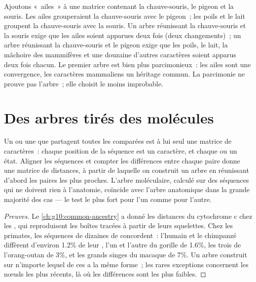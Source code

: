 \begin{example}\label{ex:g12:phylogenetic-trees:parsimony}
Ajoutons «~ailes~» à une matrice contenant la chauve-souris, le pigeon
et la souris. Les ailes grouperaient la chauve-souris avec le pigeon~;
les poils et le lait groupent la chauve-souris avec la souris. Un
arbre réunissant la chauve-souris et la souris exige que les ailes
soient apparues deux fois (deux changements)~; un arbre réunissant la
chauve-souris et le pigeon exige que les poils, le lait, la mâchoire
des mammifères et une douzaine d'autres caractères soient apparus deux
fois chacun. Le premier arbre est bien plus parcimonieux~: les ailes
sont une convergence, les caractères mammaliens un héritage commun. La
parcimonie ne prouve pas l'arbre~; elle choisit le moins improbable.
\end{example}

\section{Des arbres tirés des molécules}

\begin{proposition}\label{prop:g12:phylogenetic-trees:molecular}
Un  ou une  que partagent toutes les  comparées est
à lui seul une matrice de caractères~: chaque position de la séquence
est un caractère, et chaque  ou  un état. Aligner
les séquences et compter les différences entre chaque paire donne une
matrice de distances, à partir de laquelle on construit un arbre en
réunissant d'abord les paires les plus proches. L'arbre moléculaire,
calculé sur des séquences qui ne doivent rien à l'anatomie, coïncide
avec l'arbre anatomique dans la grande majorité des cas --- le test le
plus fort pour l'un comme pour l'autre.
\end{proposition}
\begin{proof}[Preuves]
Le \cref{ch:g10:common-ancestry} a donné les distances du cytochrome c
chez les , qui reproduisent les boîtes tracées à partir de
leurs squelettes. Chez les primates, les séquences de dizaines de
 concordent~: l'humain et le chimpanzé diffèrent d'environ 1.2\%
de leur , l'un et l'autre du gorille de 1.6\%, les trois de
l'orang-outan de 3\%, et les grands singes du macaque de 7\%. Un arbre
construit sur n'importe lequel de ces  a la même forme~; les
rares exceptions concernent les nœuds les plus récents, là où les
différences sont les plus faibles.
\end{proof}

